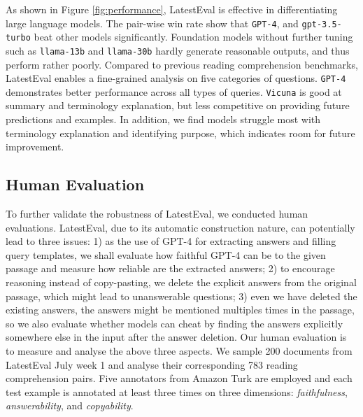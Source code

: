 \documentclass[letterpaper]{article} %
\begin{document}
As shown in Figure \ref{fig:performance}, LatestEval is effective in differentiating large language models. The pair-wise win rate show that \texttt{GPT-4}, and \texttt{gpt-3.5-turbo} beat other models significantly. 
Foundation models without further tuning such as \texttt{llama-13b} and \texttt{llama-30b} hardly generate reasonable outputs, and thus perform rather poorly. Compared to previous reading comprehension benchmarks, LatestEval enables a fine-grained analysis on five categories of questions. \texttt{GPT-4} demonstrates better performance across all types of queries. \texttt{Vicuna} is good at summary and terminology explanation, but less competitive on providing future predictions and examples. In addition, we find models struggle most with terminology explanation and identifying purpose, which indicates room for future improvement.

\subsection{Human Evaluation}
To further validate the robustness of LatestEval, we conducted human evaluations.
LatestEval, due to its automatic construction nature, can potentially lead to three issues: 1) as the use of GPT-4 for extracting answers and filling query templates, we shall evaluate how faithful GPT-4 can be to the given passage and measure how reliable are the extracted answers; 2) to encourage reasoning instead of copy-pasting, we delete the explicit answers from the original passage, which might lead to unanswerable questions; 3) even we have deleted the existing answers, the answers might be mentioned multiples times in the passage, so we also evaluate whether models can cheat by finding the answers explicitly somewhere else in the input after the answer deletion. 
Our human evaluation is to measure and analyse the above three aspects. We sample 200 documents from LatestEval July week 1 and analyse their corresponding 783 reading comprehension pairs. Five annotators from Amazon Turk are employed and each test example is annotated at least three times on three dimensions: \textit{faithfulness}, \textit{answerability}, and \textit{copyability}.
\end{document}
